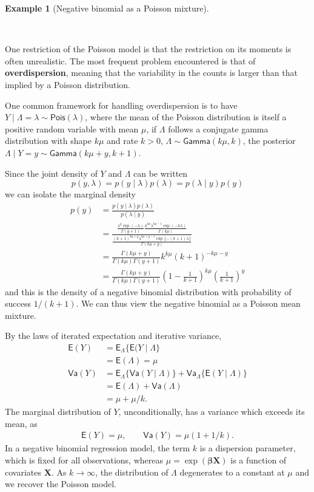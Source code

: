 \documentclass[
  11pt,
  letterpaper,
]{scrbook}
\theoremstyle{definition}
\newtheorem{example}{Example}[chapter]
\theoremstyle{definition}
\theoremstyle{definition}
\theoremstyle{plain}
\theoremstyle{remark}
\begin{document}
\begin{example}[Negative binomial as a Poisson
mixture]\protect\hypertarget{exm-poisson-negbin}{}\label{exm-poisson-negbin}

~

One restriction of the Poisson model is that the restriction on its
moments is often unrealistic. The most frequent problem encountered is
that of \textbf{overdispersion}, meaning that the variability in the
counts is larger than that implied by a Poisson distribution.

One common framework for handling overdispersion is to have
\(Y \mid \Lambda = \lambda \sim \mathsf{Pois}(\lambda)\), where the mean
of the Poisson distribution is itself a positive random variable with
mean \(\mu\), if \(\Lambda\) follows a conjugate gamma distribution with
shape \(k\mu\) and rate \(k>0\),
\(\Lambda \sim \mathsf{Gamma}(k\mu, k)\), the posterior
\(\Lambda \mid Y=y \sim \mathsf{Gamma}(k\mu + y, k+1)\).

Since the joint density of \(Y\) and \(\Lambda\) can be written \[
p(y, \lambda) = p(y \mid \lambda)p(\lambda) = p(\lambda \mid y) p(y)
\] we can isolate the marginal density \begin{align*}
p(y) &= \frac{p(y \mid \lambda)p(\lambda)}{p(\lambda \mid y)} \\&= \frac{\frac{\lambda^y\exp(-\lambda)}{\Gamma(y+1)}  \frac{k^{k\mu}\lambda^{k\mu-1}\exp(-k\lambda)}{\Gamma(k\mu)}}{ \frac{(k+1)^{k\mu+y}\lambda^{k\mu+y-1}\exp\{-(k+1)\lambda\}}{\Gamma(k\mu+y)}}\\
&= \frac{\Gamma(k\mu+y)}{\Gamma(k\mu)\Gamma(y+1)}k^{k\mu} (k+1)^{-k\mu-y}\\&= \frac{\Gamma(k\mu+y)}{\Gamma(k\mu)\Gamma(y+1)}\left(1-\frac{1}{k+1}\right)^{k\mu} \left(\frac{1}{k+1}\right)^y
\end{align*} and this is the density of a negative binomial distribution
with probability of success \(1/(k+1)\). We can thus view the negative
binomial as a Poisson mean mixture.

By the laws of iterated expectation and iterative variance,
\begin{align*}
\mathsf{E}(Y) &= \mathsf{E}_{\Lambda}\{\mathsf{E}(Y \mid \Lambda\} \\& = \mathsf{E}(\Lambda) = \mu\\
\mathsf{Va}(Y) &= \mathsf{E}_{\Lambda}\{\mathsf{Va}(Y \mid \Lambda)\} + \mathsf{Va}_{\Lambda}\{\mathsf{E}(Y \mid \Lambda)\} \\&= \mathsf{E}(\Lambda) + \mathsf{Va}(\Lambda) \\&= \mu + \mu/k.
\end{align*} The marginal distribution of \(Y\), unconditionally, has a
variance which exceeds its mean, as \begin{align*}
\mathsf{E}(Y) = \mu, \qquad \mathsf{Va}(Y) = \mu (1+1/k).
\end{align*} In a negative binomial regression model, the term \(k\) is
a dispersion parameter, which is fixed for all observations, whereas
\(\mu = \exp(\boldsymbol{\beta}\mathbf{X})\) is a function of covariates
\(\mathbf{X}\). As \(k \to \infty\), the distribution of \(\Lambda\)
degenerates to a constant at \(\mu\) and we recover the Poisson model.


\end{example}
\end{document}
